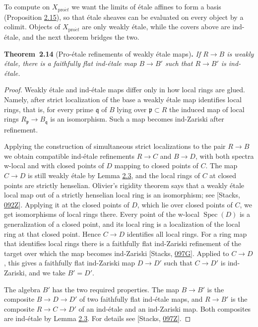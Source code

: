 \documentclass[11pt]{article}
\newenvironment{bpstatement}[2]{\par\addvspace{0.6\baselineskip}\noindent\textbf{#1}#2\textbf{.}\enspace\ignorespaces}
  {\par\addvspace{0.4\baselineskip}}
\newenvironment{bpstatementit}[2]{\begin{bpstatement}{#1}{#2}\itshape\ignorespaces}{\end{bpstatement}}
\begin{document}
\label{bp41}%
To compute on \(X_{\mathrm{pro}\acute{e}t}\) we want the limits of étale affines to form a basis (Proposition \hyperref[bp46]{2.15}), so that étale sheaves can be evaluated on every object by a colimit. Objects of \(X_{\mathrm{pro}\acute{e}t}\) are only weakly étale, while the covers above are ind-étale, and the next theorem bridges the two.

\label{bp42}%
\begin{bpstatementit}{Theorem~2.14}{ (Pro-étale refinements of weakly étale maps)}
If \(R\to B\) is weakly étale, there is a faithfully flat ind-étale map \(B\to B'\) such that \(R\to B'\) is ind-étale.
\end{bpstatementit}

\begin{proof}[{Proof}]\label{bp43}%
Weakly étale and ind-étale maps differ only in how local rings are glued. Namely, after strict localization of the base a weakly étale map identifies local rings, that is, for every prime \(\mathfrak q\) of \(B\) lying over \(\mathfrak p\subset R\) the induced map of local rings \(R_{\mathfrak p}\to B_{\mathfrak q}\) is an isomorphism. Such a map becomes ind-Zariski after refinement.

Applying the construction of simultaneous strict localizations to the pair \(R\to B\) we obtain compatible ind-étale refinements \(R\to C\) and \(B\to D\), with both spectra w-local and with closed points of \(D\) mapping to closed points of \(C\). The map \(C\to D\) is still weakly étale by Lemma \hyperref[bp12]{2.3}, and the local rings of \(C\) at closed points are strictly henselian. Olivier's rigidity theorem says that a weakly étale local map out of a strictly henselian local ring is an isomorphism; see [Stacks, \href{https://stacks.math.columbia.edu/tag/092Z}{092Z}]. Applying it at the closed points of \(D\), which lie over closed points of \(C\), we get isomorphisms of local rings there. Every point of the w-local \(\operatorname{Spec}(D)\) is a generalization of a closed point, and its local ring is a localization of the local ring at that closed point. Hence \(C\to D\) identifies all local rings. For a ring map that identifies local rings there is a faithfully flat ind-Zariski refinement of the target over which the map becomes ind-Zariski [Stacks, \href{https://stacks.math.columbia.edu/tag/097G}{097G}]. Applied to \(C\to D\), this gives a faithfully flat ind-Zariski map \(D\to D'\) such that \(C\to D'\) is ind-Zariski, and we take \(B'=D'\).

The algebra \(B'\) has the two required properties. The map \(B\to B'\) is the composite \(B\to D\to D'\) of two faithfully flat ind-étale maps, and \(R\to B'\) is the composite \(R\to C\to D'\) of an ind-étale and an ind-Zariski map. Both composites are ind-étale by Lemma \hyperref[bp12]{2.3}. For details see [Stacks, \href{https://stacks.math.columbia.edu/tag/097Z}{097Z}].
\end{proof}
\end{document}
